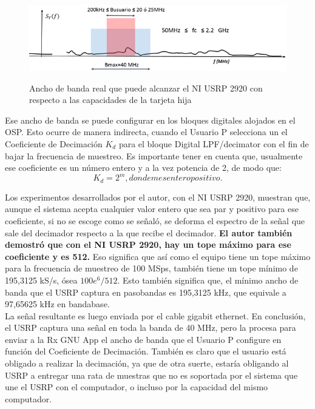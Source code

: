 \begin{figure}[h!]
	\captionsetup{justification = raggedright, singlelinecheck = false}
	\caption{Ancho de banda real que puede alcanzar el NI USRP 2920 con respecto a las capacidades de la tarjeta hija} 
	\centering
	\includegraphics[scale=1]{Imagenes/Ancho-banda-real.png}
	\label{fig:Ancho-banda-real}
\end{figure}

Ese ancho de banda se puede configurar en los bloques digitales alojados en el OSP. Esto ocurre de manera indirecta, cuando el Usuario P selecciona un el Coeficiente de Decimación $K_{d}$ para el bloque Digital LPF/decimator con el fin de bajar la frecuencia de muestreo. Es importante tener en cuenta que, usualmente ese coeficiente es un número entero y a la vez potencia de 2, de modo que: \\

\begin{equation} \label{captres_uno}
 K_{d} =2^{m}, donde m es entero positivo. \end{equation}

Los experimentos desarrollados por el autor, con el NI USRP 2920, muestran que, aunque el sistema acepta cualquier valor entero que sea par y positivo para ese coeficiente, si no se escoge como se señaló, se deforma el espectro de la señal que sale del decimador respecto a la que recibe el decimador. \textbf{El autor también demostró que con el NI USRP 2920, hay un tope máximo para ese coeficiente y es 512.} Eso significa que así como el equipo tiene un tope máximo para la frecuencia de muestreo de 100 MSps, también tiene un tope mínimo de 195,3125 kS/s, ósea $100e^{6}/512$. Esto también significa que, el mínimo ancho de banda que el USRP captura en pasobandas es 195,3125 kHz, que equivale a 97,65625 kHz en bandabase. \\

La señal resultante es luego enviada por el cable gigabit ethernet. En conclusión, el USRP captura una señal en toda la banda de 40 MHz, pero la procesa para enviar a la Rx GNU App el ancho de banda que el Usuario P configure en función del Coeficiente de Decimación. También es claro que el usuario está obligado a realizar la decimación, ya que de otra suerte, estaría obligando al USRP a entregar una rata de muestras que no es soportada por el sistema que une el USRP con el computador, o incluso por la capacidad del mismo computador. \\


